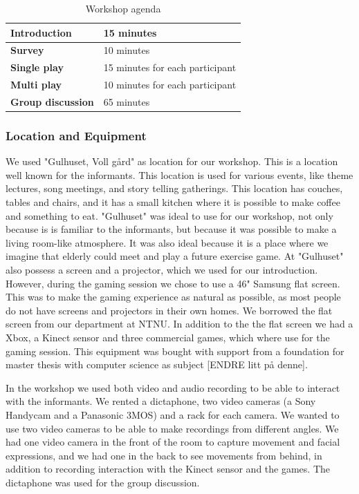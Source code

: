 \begin{table} [ht!]
\centering
    \begin{tabular}{|l|l|}
       \hline
       \textbf{Introduction} & 15 minutes  \\ \hline
       \textbf{Survey} & 10 minutes  \\ \hline
       \textbf{Single play} & 15 minutes for each participant \\ \hline
       \textbf{Multi play} & 10 minutes for each participant \\ \hline
	   \textbf{Group discussion} & 65 minutes \\ \hline
    \end{tabular}
    \caption[Workshop Agenda]{Workshop agenda}
    \label{tab:agendaW1}
\end{table}  

\subsubsection{Location and Equipment}
We used "Gulhuset, Voll gård" as location for our workshop. This is a location well known for the informants. This location is used for various events, like theme lectures, song meetings, and story telling gatherings. This location has couches, tables and chairs, and it has a small kitchen where it is possible to make coffee and something to eat. "Gulhuset" was ideal to use for our workshop, not only because is is familiar to the informants, but because it was possible to make a living room-like atmosphere. It was also ideal because it is a place where we imagine that elderly could meet and play a future exercise game. At "Gulhuset" also possess a screen and a projector, which we used for our introduction. However, during the gaming session we chose to use a 46" Samsung flat screen. This was to make the gaming experience as natural as possible, as most people do not have screens and projectors in their own homes. We borrowed the flat screen from our department at NTNU. In addition to the the flat screen we had a Xbox, a Kinect sensor and three commercial games, which where use for the gaming session. This equipment was bought with support from a foundation for master thesis with computer science as subject [ENDRE litt på denne].   

In the workshop we used both video and audio recording to be able to interact with the informants. We rented a dictaphone, two video cameras (a Sony Handycam and a Panasonic 3MOS) and a rack for each camera. We wanted to use two video cameras to be able to make recordings from different angles. We had one video camera in the front of the room to capture movement and facial expressions, and we had one in the back to see movements from behind, in addition to recording interaction with the Kinect sensor and the games. The dictaphone was used for the group discussion.    

